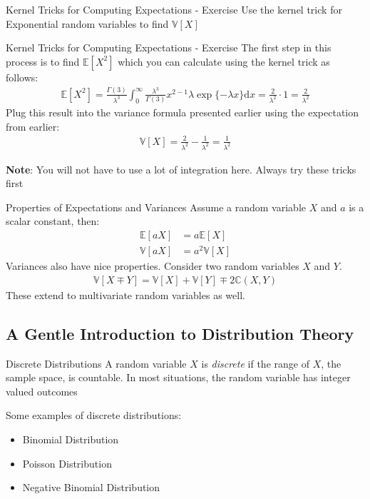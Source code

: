 \documentclass{beamer}
\begin{document}
\begin{frame}{Kernel Tricks for Computing Expectations - Exercise}
Use the kernel trick for Exponential random variables to find $\mathbb{V}[X]$
\end{frame}


\begin{frame}{Kernel Tricks for Computing Expectations - Exercise}
The first step in this process is to find $\mathbb{E}[X^{2}]$ which you can calculate using the kernel trick as follows:
\begin{align*}
\mathbb{E}[X^{2}] = \frac{\Gamma(3)}{\lambda^{3}}\int_{0}^{\infty}\frac{\lambda^{3}}{\Gamma(3)} x^{2-1}\lambda\exp\{-\lambda x\} \mathrm{d}x = \frac{2}{\lambda^{2}} \cdot 1 = \frac{2}{\lambda^{2}}
\end{align*}
Plug this result into the variance formula presented earlier using the expectation from earlier:
\begin{align*}
\mathbb{V}[X] = \frac{2}{\lambda^{2}} - \frac{1}{\lambda^{2}} = \frac{1}{\lambda^{2}}
\end{align*}

\textbf{Note}: You will not have to use a lot of integration here. Always try these tricks first
\end{frame}

\begin{frame}{Properties of Expectations and Variances}
Assume a random variable $X$ and $a$ is a scalar constant, then:
\begin{align*}
\mathbb{E}[aX] &= a \mathbb{E}[X] \\
\mathbb{V}[aX] &= a^{2} \mathbb{V}[X]
\end{align*}
Variances also have nice properties. Consider two random variables $X$ and $Y$.
\begin{align*}
\mathbb{V}[X \mp Y] = \mathbb{V}[X] + \mathbb{V}[Y] \mp 2\mathbb{C}(X,Y)
\end{align*}
These extend to multivariate random variables as well.
\end{frame}

\subsection{A Gentle Introduction to Distribution Theory}

\begin{frame}{Discrete Distributions}
A random variable $X$ is \emph{discrete} if the range of $X$, the sample space, is countable. In most situations, the random variable has integer valued outcomes
\newline

Some examples of discrete distributions:
\begin{itemize}
\item{Binomial Distribution}
\item{Poisson Distribution}
\item{Negative Binomial Distribution}
\end{itemize}
\end{frame}
\end{document}
